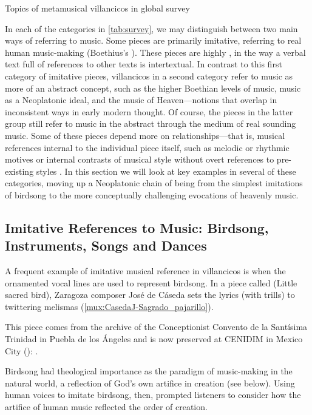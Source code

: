 {Topics of metamusical villancicos in global survey}

In each of the categories in \cref{tab:survey}, we may distinguish between two
main ways of referring to music.  
Some pieces are primarily imitative, referring to real human music-making
(Boethius's ).
These pieces are highly , in the way a verbal text full of
references to other texts is intertextual.
In contrast to this first category of imitative pieces, villancicos in a second
category refer to music as more of an abstract concept, such as the higher
Boethian levels of music, music as a Neoplatonic ideal, and the music of
Heaven---notions that overlap in inconsistent ways in early modern thought.
Of course, the pieces in the latter group still refer to music in the abstract
through the medium of real sounding music.  
Some of these pieces depend more on  relationships---that
is, musical references internal to the individual piece itself, such as melodic
or rhythmic motives or internal contrasts of musical style without overt
references to pre-existing styles .
In this section we will look at key examples in several of these categories,
moving up a Neoplatonic chain of being from the simplest imitations of birdsong
to the more conceptually challenging evocations of heavenly music.

\subsection{Imitative References to Music: Birdsong, Instruments, Songs and
Dances}

A frequent example of imitative musical reference in villancicos is when the
ornamented vocal lines are used to represent birdsong.%
    \Autocite[295--301]{Illari:Polychoral}
In a piece called  (Little sacred bird), Zaragoza
composer José de Cáseda sets the lyrics  (with trills) to
twittering melismas (\cref{mux:CasedaJ-Sagrado_pajarillo}).%
\begin{Footnote} 
    This piece comes from the archive of the Conceptionist Convento de la
    Santísima Trinidad in Puebla de los Ángeles and is now preserved at CENIDIM
    in Mexico City (): 
    \autocite{Tello:SanchezGarzaCatalogo}.
\end{Footnote}
Birdsong had theological importance as the paradigm of music-making in the
natural world, a reflection of God's own artifice in creation (see below).
Using human voices to imitate birdsong, then, prompted listeners to consider
how the artifice of human music reflected the order of creation.

